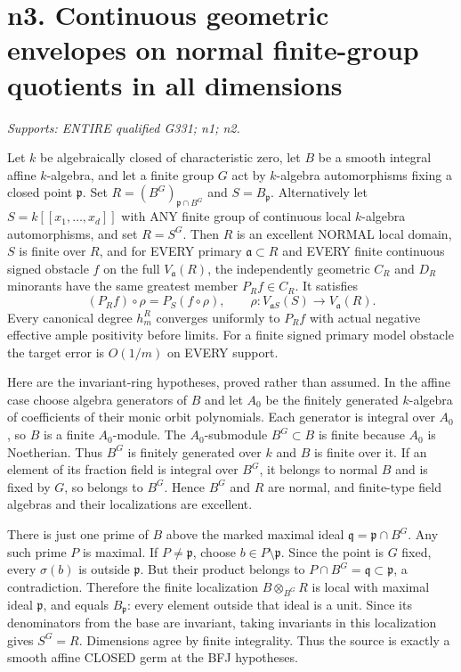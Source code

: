 \section{n3. Continuous geometric envelopes on normal finite-group quotients in all dimensions}
\textit{Supports: ENTIRE qualified G331; n1; n2.}

\begin{theorem}
Let $k$ be algebraically closed of characteristic zero, let $B$ be a smooth
integral affine $k$-algebra, and let a finite group $G$ act by $k$-algebra
automorphisms fixing a closed point $\mathfrak p$. Set
$R=(B^G)_{\mathfrak p\cap B^G}$ and $S=B_{\mathfrak p}$.
Alternatively let $S=k[[x_1,\ldots,x_d]]$ with ANY finite group of continuous
local $k$-algebra automorphisms, and set $R=S^G$.
Then $R$ is an excellent NORMAL local domain, $S$ is finite over $R$, and
for EVERY primary $\mathfrak a\subset R$ and EVERY finite continuous signed
obstacle $f$ on the full $V_{\mathfrak a}(R)$, the independently geometric
$C_R$ and $D_R$ minorants have the same greatest member $P_R f\in C_R$.
It satisfies
\[
 (P_R f)\circ\rho=P_S(f\circ\rho),\qquad
 \rho:V_{\mathfrak aS}(S)\longrightarrow V_{\mathfrak a}(R).
\]
Every canonical degree $h_m^R$ converges uniformly to $P_R f$ with actual
negative effective ample positivity before limits. For a finite signed
primary model obstacle the target error is $O(1/m)$ on EVERY support.
\end{theorem}

Here are the invariant-ring hypotheses, proved rather than assumed.
In the affine case choose algebra generators of $B$ and let $A_0$ be the
finitely generated $k$-algebra of coefficients of their monic orbit
polynomials. Each generator is integral over $A_0$, so $B$ is a finite
$A_0$-module. The $A_0$-submodule $B^G\subset B$ is finite because $A_0$
is Noetherian. Thus $B^G$ is finitely generated over $k$ and $B$ is finite
over it. If an element of its fraction field is integral over $B^G$, it
belongs to normal $B$ and is fixed by $G$, so belongs to $B^G$. Hence
$B^G$ and $R$ are normal, and finite-type field algebras and their
localizations are excellent.

There is just one prime of $B$ above the marked maximal ideal
$\mathfrak q=\mathfrak p\cap B^G$. Any such prime $P$ is maximal. If
$P\ne\mathfrak p$, choose $b\in P\setminus\mathfrak p$. Since the point
is $G$ fixed, every $\sigma(b)$ is outside $\mathfrak p$. But their
product belongs to $P\cap B^G=\mathfrak q\subset\mathfrak p$, a
contradiction. Therefore the finite localization $B\otimes_{B^G}R$
is local with maximal ideal $\mathfrak p$, and equals $B_{\mathfrak p}$:
every element outside that ideal is a unit. Since its denominators from
the base are invariant, taking invariants in this localization gives
$S^G=R$. Dimensions agree by finite integrality. Thus the source is
exactly a smooth affine CLOSED germ at the BFJ hypotheses.

